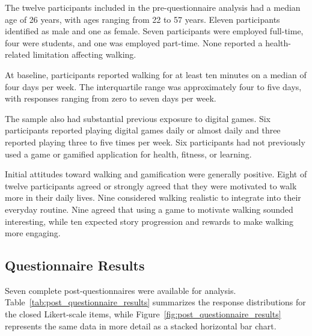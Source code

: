 The twelve participants included in the pre-questionnaire analysis had a median age of 26 years, with ages ranging from 22 to 57 years. Eleven participants identified as male and one as female. Seven participants were employed full-time, four were students, and one was employed part-time. None reported a health-related limitation affecting walking.

At baseline, participants reported walking for at least ten minutes on a median of four days per week. The interquartile range was approximately four to five days, with responses ranging from zero to seven days per week.

The sample also had substantial previous exposure to digital games. Six participants reported playing digital games daily or almost daily and three reported playing three to five times per week. Six participants had not previously used a game or gamified application for health, fitness, or learning.

Initial attitudes toward walking and gamification were generally positive. Eight of twelve participants agreed or strongly agreed that they were motivated to walk more in their daily lives. Nine considered walking realistic to integrate into their everyday routine. Nine agreed that using a game to motivate walking sounded interesting, while ten expected story progression and rewards to make walking more engaging.

\subsection{Questionnaire Results}

Seven complete post-questionnaires were available for analysis. Table~\ref{tab:post_questionnaire_results} summarizes the response distributions for the closed Likert-scale items, while Figure~\ref{fig:post_questionnaire_results} represents the same data in more detail as a stacked horizontal bar chart.

